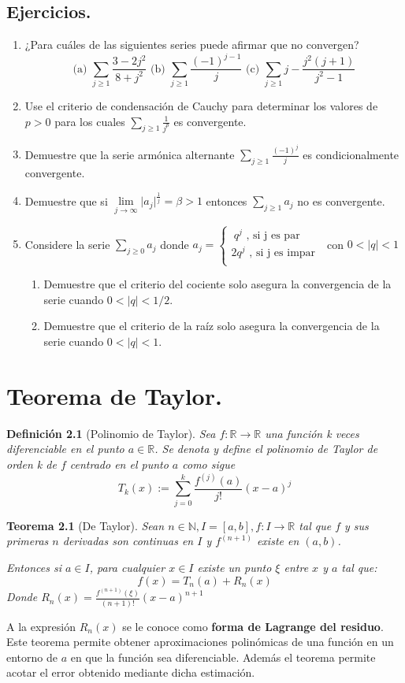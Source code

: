 \documentclass[12pt]{book}
\newcommand\R{{\mathbb R}}
\newcommand\N{{\mathbb N}}
\providecommand{\abs}[1]{\lvert#1\rvert}
\newtheorem{teo}{Teorema}[section]
\newtheorem{defi}{Definición}[section]
\begin{document}
\section{Ejercicios.}
\begin{enumerate}
    \item ¿Para cuáles de las siguientes series puede afirmar que no convergen? $$\mbox{(a)  } \sum_{j \ge 1}\frac{3-2j^2}{8+j^2} \mbox{  (b)  } \sum_{j \ge 1}\frac{(-1)^{j-1}}{j} \mbox{  (c)  } \sum_{j \ge 1}j-\frac{j^2(j+1)}{j^2-1}$$
    \item Use el criterio de condensación de Cauchy para determinar los valores de $p>0$ para los cuales $\sum_{j \ge 1}\frac{1}{j^p}$ es convergente.
    \item Demuestre que la serie armónica alternante $\sum_{j \ge 1}\frac{(-1)^j}{j}$ es condicionalmente convergente.
    \item Demuestre que si $\lim\limits_{j \to \infty}\abs{a_j}^{\frac{1}{j}}=\beta>1$ entonces $\sum_{j \ge 1}a_j$ no es convergente.
    \item Considere la serie $\sum_{j \ge 0}a_j$ donde $a_j=\left\{ \begin{array}{lcc}
             \ q^j \mbox{ , si j es par }
             \\2q^j \mbox{ , si j es impar }  \\
             \end{array}
             \right.$
    con $0<\abs{q}<1$
    \begin{enumerate}
        \item Demuestre que el criterio del cociente solo asegura la convergencia de la serie cuando $0<\abs{q}<1/2$.
        \item Demuestre que el criterio de la raíz solo asegura la convergencia de la serie cuando $0<\abs{q}<1$.
    \end{enumerate}
\end{enumerate}
\chapter{Teorema de Taylor.}
\begin{defi}[Polinomio de Taylor]\rm
Sea $f: \R \rightarrow \R $ una función k veces diferenciable en el punto $a \in \R$. Se denota y define el polinomio de Taylor de orden k de $f$ centrado en el punto $a$ como sigue
$$T_k(x):=\sum_{j=0}^k \frac{f^{(j)}(a)}{j!}(x-a)^j$$
\end{defi}
\begin{teo}[De Taylor]\rm
Sean $n \in \N, I=[a,b], f:I \rightarrow \R$ tal que $f$ y sus primeras $n$ derivadas son continuas en $I$ y $f^{(n+1)}$ existe en $(a,b)$.

Entonces si $a \in I$, para cualquier $x \in I$ existe un punto $\xi$ entre $x$ y $a$ tal que:
$$f(x)=T_n(a)+R_n(x)$$
Donde $R_n(x)=\frac{f^{(n+1)}(\xi)}{(n+1)!}(x-a)^{n+1}$
\end{teo}
A la expresión $R_n(x)$ se le conoce como \textbf{forma de Lagrange del residuo}. Este teorema permite obtener aproximaciones polinómicas de una función en un entorno de $a$ en que la función sea diferenciable. Además el teorema permite acotar el error obtenido mediante dicha estimación.
\end{document}

